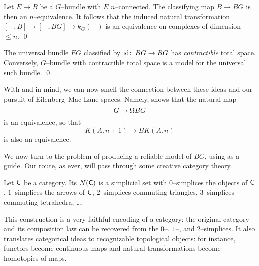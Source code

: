 \begin{lemma}
Let $E \to B$ be a $G$--bundle with $E$ $n$--connected.
The classifying map $B \to BG$ is then an $n$--equivalence.
It follows that the induced natural transformation $[-, B] \to [-, BG] \to k_G(-)$ is an equivalence on complexes of dimension $\le n$.
\qed
\end{lemma}

\begin{corollary}\label{CharacterizationOfBG}
The universal bundle $EG$ classified by $\operatorname{id}\colon\thinspace BG \to BG$ has \emph{contractible} total space.
Conversely, $G$--bundle with contractible total space is a model for the universal such bundle.
\qed
\end{corollary}

\begin{remark}
With  and  in mind, we can now smell the connection between these ideas and our pursuit of Eilenberg--Mac Lane spaces.
Namely,  shows that the natural map \[G \to \Omega BG\] is an equivalence, so that \[K(A, n+1) \to BK(A, n)\] is also an equivalence.%
\end{remark}

We now turn to the problem of producing a reliable model of $BG$, using  as a guide.
Our route, as ever, will pass through some creative category theory.

\begin{definition}
Let $\mathsf{C}$ be a category.
Its  $N(\mathsf{C})$ is a simplicial set with $0$--simplices the objects of $\mathsf{C}$, $1$--simplices the arrows of $\mathsf{C}$, $2$--simplices commuting triangles, $3$--simplices commuting tetrahedra, \ldots .
\end{definition}

\begin{remark}
This construction is a very faithful encoding of a category: the original category and its composition law can be recovered from the $0$--. $1$--, and $2$--simplices.
It also translates categorical ideas to recognizable topological objects: for instance, functors become continuous maps and natural transformations become homotopies of maps.
\end{remark}

